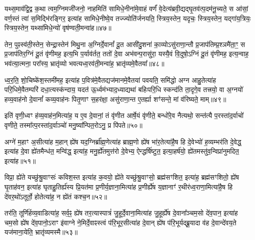 यथ्स॒माव॑द्वि॒द्व क॒था त्वम॒ग्निमजी॑जनो॒ नाहमिति॑ सामिधे॒नीना॑मे॒वाहं वर्णं॑ वे॒देत्य॑ब्रवी॒द्यद्घृ॒तव॑त्प॒दम॑नू॒च्यते॒ स आ॑सां॒ वर्ण॒स्तं त्वा॑ स॒मिद्भि॑रङ्गिर॒ इत्या॑ह सामिधे॒नीष्वे॒व तज्ज्योति॑र्जनयति॒ स्त्रिय॒स्तेन॒ यदृचः॒ स्त्रिय॒स्तेन॒ यद्गा॑य॒त्रियः॒ स्त्रिय॒स्तेन॒ यथ्सा॑मिधे॒न्यो॑ वृष॑ण्वती॒मन्वा॑ह॥४७॥

तेन॒ पुꣴस्व॑ती॒स्तेन॒ सेन्द्रा॒स्तेन॑ मिथु॒ना अ॒ग्निर्दे॒वानां᳚ दू॒त आसी॑दु॒शना॑ का॒व्यो\-ऽसु॑राणा॒न्तौ प्र॒जाप॑तिम्प्र॒श्ञमै॑ता॒ꣳ॒ स प्र॒जाप॑तिर॒ग्निं दू॒तं वृ॑णीमह॒ इत्य॒भि प॒र्याव॑र्तत॒ ततो॑ दे॒वा अभ॑वन्प॒रासु॑रा॒ यस्यै॒वं वि॒दुषो॒\-ऽग्निं दू॒तं वृ॑णीमह॒ इत्य॒न्वाह॒ भव॑त्या॒त्मना॒ परा᳚स्य॒ भ्रातृ॑व्यो भवत्यध्व॒रव॑ती॒मन्वा॑ह॒ भ्रातृ॑व्यमे॒वैतया᳚॥४८॥

ध्व॒र॒ति॒ शो॒चिष्के॑श॒स्तमी॑मह॒ इत्या॑ह प॒वित्र॑मे॒वैतद्यज॑मानमे॒वैतया॑ पवयति॒ समि॑द्धो अग्न आहु॒तेत्या॑ह परि॒धिमे॒वैतम्परि॑ दधा॒त्यस्क॑न्दाय॒ यदत॑ ऊ॒र्ध्वम॑भ्याद॒ध्याद्यथा॑ बहिःपरि॒धि स्कन्द॑ति ता॒दृगे॒व तत्त्रयो॒ वा अ॒ग्नयो॑ हव्य॒वाह॑नो दे॒वानां᳚ कव्य॒वाह॑नः पितृ॒णाꣳ स॒हर॑क्षा॒ असु॑राणा॒न्त ए॒तर्\mbox{}ह्या शꣳ॑सन्ते॒ मां व॑रिष्यते॒ माम्॥४९॥

इति॑ वृणी॒ध्वꣳ ह॑व्य॒वाह॑न॒मित्या॑ह॒ य ए॒व दे॒वानां॒ तं वृ॑णीत आर्\mbox{}षे॒यं वृ॑णीते॒ बन्धो॑रे॒व नैत्यथो॒ सन्त॑त्यै प॒रस्ता॑द॒र्वाचो॑ वृणीते॒ तस्मा᳚त्प॒रस्ता॑द॒र्वाञ्चो॑ मनु॒ष्या᳚न्पित॒रो\-ऽनु॒ प्र पि॑पते॥५०॥

{\anuvakamend[{अशा᳚न्तावाह॒ पञ्च॑दशाब्रवी॒दन्वा॑है॒तया॑ वरिष्यते॒ मामेका॒न्नत्रि॒ꣳ॒शच्च॑॥८॥}]}

अग्ने॑ म॒हाꣳ अ॒सीत्या॑ह म॒हान् ह्ये॑ष यद॒ग्निर्ब्रा᳚ह्म॒णेत्या॑ह ब्राह्म॒णो ह्ये॑ष भा॑र॒तेत्या॑है॒ष हि दे॒वेभ्यो॑ ह॒व्यम्भर॑ति दे॒वेद्ध॒ इत्या॑ह दे॒वा ह्ये॑तमैन्ध॑त॒ मन्वि॑द्ध॒ इत्या॑ह॒ मनु॒र्\mbox{}ह्ये॑तमुत्त॑रो दे॒वेभ्य॒ ऐन्द्धर्\mbox{}षि॑ष्टुत॒ इत्या॒हर्\mbox{}ष॑यो॒ ह्ये॑तमस्तु॑व॒न्विप्रा॑नुमदित॒ इत्या॑ह॥५१॥

विप्रा॒ ह्ये॑ते यच्छु॑श्रु॒वाꣳसः॑ कविश॒स्त इत्या॑ह क॒वयो॒ ह्ये॑ते यच्छु॑श्रु॒वाꣳसो॒ ब्रह्म॑सꣳशित॒ इत्या॑ह॒ ब्रह्म॑सꣳशितो॒ ह्ये॑ष घृ॒ताह॑वन॒ इत्या॑ह घृताहु॒तिर्\mbox{}ह्य॑स्य प्रि॒यत॑मा प्र॒णीर्य॒ज्ञाना॒मित्या॑ह प्र॒णीर्\mbox{}ह्ये॑ष य॒ज्ञानाꣳ॑ र॒थीर॑ध्व॒राणा॒मित्या॑है॒ष हि दे॑वर॒थो॑\-ऽतूर्तो॒ होतेत्या॑ह॒ न ह्ये॑तं कश्च॒न॥५२॥

तर॑ति॒ तूर्णि॑र्\mbox{}हव्य॒वाडित्या॑ह॒ सर्व॒ꣴ॒ ह्ये॑ष तर॒त्यास्पात्रं॑ जु॒हूर्दे॒वाना॒मित्या॑ह जु॒हूर्\mbox{}ह्ये॑ष दे॒वाना᳚ञ्चम॒सो दे॑व॒पान॒ इत्या॑ह चम॒सो ह्ये॑ष दे॑व॒पानो॒\-ऽराꣳ इ॑वाग्ने ने॒मिर्दे॒वाꣴस्त्वं प॑रि॒भूर॒सीत्या॑ह दे॒वान् ह्ये॑ष प॑रि॒भूर्यद्ब्रू॒यादा व॑ह दे॒वान्दे॑वय॒ते यज॑माना॒येति॒ भ्रातृ॑व्यमस्मै॥५३॥

